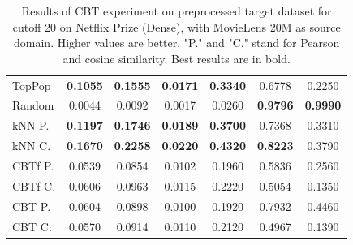\begin{table}[hbt]
\begin{tabulary}{\textwidth}{|L|CCCCCC|}
TopPop & \textbf{0.1055} & \textbf{0.1555} & \textbf{0.0171} & \textbf{0.3340} & 0.6778 & 0.2250 \\
Random & 0.0044 & 0.0092 & 0.0017 & 0.0260 & \textbf{0.9796} & \textbf{0.9990} \\
kNN P. & \textbf{0.1197} & \textbf{0.1746} & \textbf{0.0189} & \textbf{0.3700} & 0.7368 & 0.3310 \\
kNN C. & \textbf{0.1670} & \textbf{0.2258} & \textbf{0.0220} & \textbf{0.4320} & \textbf{0.8223} & 0.3790 \\
CBTf P. & 0.0539 & 0.0854 & 0.0102 & 0.1960 & 0.5836 & 0.2560 \\
CBTf C. & 0.0606 & 0.0963 & 0.0115 & 0.2220 & 0.5054 & 0.1350 \\
CBT P. & 0.0604 & 0.0898 & 0.0100 & 0.1920 & 0.7932 & 0.4460 \\
CBT C. & 0.0570 & 0.0914 & 0.0110 & 0.2120 & 0.4967 & 0.1390 \\
\hline
\end{tabulary}
\caption{Results of CBT experiment on preprocessed target dataset for cutoff 20 on Netflix Prize (Dense), with MovieLens 20M as source domain. Higher values are better. "P." and "C." stand for Pearson and cosine similarity. Best results are in bold.}
\end{table}

